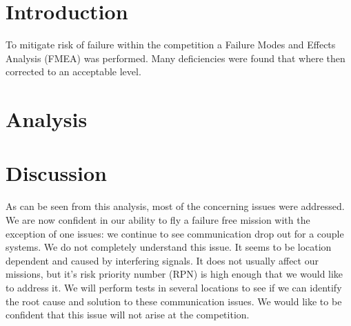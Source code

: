 \documentclass[]{auvsi_doc}
\begin{document}
\begin{AUVSITitlePage}
\begin{artifacttable}
\end{artifacttable}
\end{AUVSITitlePage}

\section{Introduction}
To mitigate risk of failure within the competition a Failure Modes and Effects Analysis (FMEA) was performed. Many deficiencies were found that where then corrected to an acceptable level.

\section{Analysis}
\begin{center}
\end{center}

\section{Discussion}
As can be seen from this analysis, most of the concerning issues were addressed. We are now confident in our ability to fly a failure free mission with the exception of one issues: we continue to see communication drop out for a couple systems. We do not completely understand this issue. It seems to be location dependent and caused by interfering signals. It does not usually affect our missions, but it's risk priority number (RPN) is high enough that we would like to address it. We will perform tests in several locations to see if we can identify the root cause and solution to these communication issues. We would like to be confident that this issue will not arise at the competition.
\end{document}
